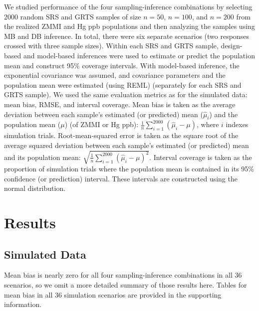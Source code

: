 \documentclass[]{elsarticle} %
\begin{document}
We studied performance of the four sampling-inference combinations by
selecting 2000 random SRS and GRTS samples of size \(n = 50\),
\(n = 100\), and \(n = 200\) from the realized ZMMI and Hg ppb
populations and then analyzing the samples using MB and DB inference. In
total, there were six separate scenarios (two responses crossed with
three sample sizes). Within each SRS and GRTS sample, design-based and
model-based inferences were used to estimate or predict the population
mean and construct 95\% coverage intervals. With model-based inference,
the exponential covariance was assumed, and covariance parameters and
the population mean were estimated (using REML) (separately for each SRS
and GRTS sample). We used the same evaluation metrics as for the
simulated data: mean bias, RMSE, and interval coverage. Mean bias is
taken as the average deviation between each sample's estimated (or
predicted) mean (\(\hat{\mu}_i\)) and the population mean (\(\mu\)) (of
ZMMI or Hg ppb): \(\frac{1}{n}\sum_{i = 1}^{2000} (\hat{\mu}_i - \mu)\),
where \(i\) indexes simulation trials. Root-mean-squared error is taken
as the square root of the average squared deviation between each
sample's estimated (or predicted) mean and its population mean:
\(\sqrt{\frac{1}{n}\sum_{i = 1}^{2000} (\hat{\mu}_i - \mu)^2}\).
Interval coverage is taken as the proportion of simulation trials where
the population mean is contained in its 95\% confidence (or prediction)
interval. These intervals are constructed using the normal distribution.

\hypertarget{sec:results}{%
\section{Results}\label{sec:results}}

\hypertarget{sec:r_sim}{%
\subsection{Simulated Data}\label{sec:r_sim}}

Mean bias is nearly zero for all four sampling-inference combinations in
all 36 scenarios, so we omit a more detailed summary of those results
here. Tables for mean bias in all 36 simulation scenarios are provided
in the supporting information.
\end{document}
